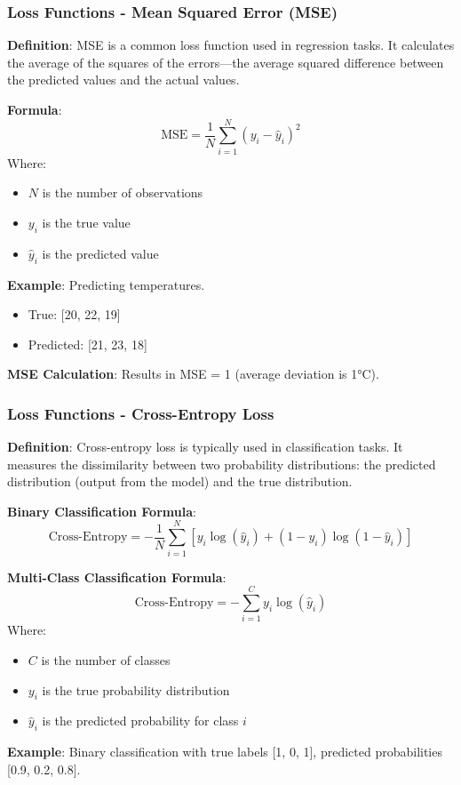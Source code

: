 \documentclass[aspectratio=169]{beamer}
\begin{document}
\begin{frame}[fragile]
    \frametitle{Loss Functions - Mean Squared Error (MSE)}
    
    \textbf{Definition}: MSE is a common loss function used in regression tasks. 
    It calculates the average of the squares of the errors—the average squared difference between the predicted values and the actual values.

    \textbf{Formula}:
    \begin{equation}
    \text{MSE} = \frac{1}{N} \sum_{i=1}^{N} (y_i - \hat{y}_i)^2 
    \end{equation}
    Where:
    \begin{itemize}
        \item \(N\) is the number of observations
        \item \(y_i\) is the true value
        \item \(\hat{y}_i\) is the predicted value
    \end{itemize}
    
    \textbf{Example}: Predicting temperatures.
    \begin{itemize}
        \item True: [20, 22, 19] 
        \item Predicted: [21, 23, 18] 
    \end{itemize}
    \textbf{MSE Calculation}: Results in MSE = 1 (average deviation is 1°C).
\end{frame}

\begin{frame}[fragile]
    \frametitle{Loss Functions - Cross-Entropy Loss}
    
    \textbf{Definition}: Cross-entropy loss is typically used in classification tasks. It measures the dissimilarity between two probability distributions: the predicted distribution (output from the model) and the true distribution.

    \textbf{Binary Classification Formula}:
    \begin{equation}
    \text{Cross-Entropy} = -\frac{1}{N} \sum_{i=1}^{N} [y_i \log(\hat{y}_i) + (1-y_i) \log(1-\hat{y}_i)] 
    \end{equation}
    
    \textbf{Multi-Class Classification Formula}:
    \begin{equation}
    \text{Cross-Entropy} = -\sum_{i=1}^{C} y_i \log(\hat{y}_i) 
    \end{equation}
    Where:
    \begin{itemize}
        \item \(C\) is the number of classes
        \item \(y_i\) is the true probability distribution
        \item \(\hat{y}_i\) is the predicted probability for class \(i\)
    \end{itemize}

    \textbf{Example}: Binary classification with true labels [1, 0, 1], predicted probabilities [0.9, 0.2, 0.8].
\end{frame}
\end{document}
